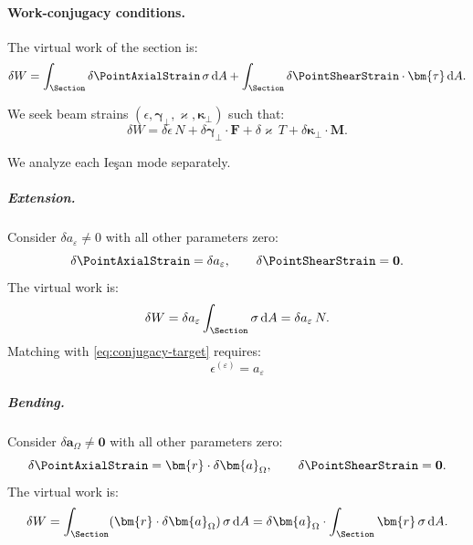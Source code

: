 \paragraph{Work-conjugacy conditions.}

The virtual work of the section is:
\begin{equation}
\delta W = \int_\Section \delta\PointAxialStrain\,\sigma \, \mathrm{d}A 
+ \int_\Section \delta\PointShearStrain \cdot \bm{\tau} \, \mathrm{d}A.
\label{eq:virtual-work}
\end{equation}

We seek beam strains $(\epsilon, \bm{\gamma}_\perp, \varkappa, \bm{\kappa}_\perp)$ 
such that:
\begin{equation}
\delta W = \delta\epsilon\,N + \delta\bm{\gamma}_\perp \cdot \bm{F} 
+ \delta\varkappa\,T + \delta\bm{\kappa}_\perp \cdot \bm{M}.
\label{eq:conjugacy-target}
\end{equation}

We analyze each Ieşan mode separately.

\subparagraph{Extension.}

Consider $\delta a_\varepsilon \neq 0$ with all other parameters zero:
\begin{equation*}
\delta\PointAxialStrain = \delta a_\varepsilon, \qquad \delta\PointShearStrain = \mathbf{0}.
\end{equation*}
The virtual work is:
\begin{equation*}
\delta W = \delta a_\varepsilon \int_\Section \sigma \, \mathrm{d}A = \delta a_\varepsilon\,N.
\end{equation*}
Matching with \eqref{eq:conjugacy-target} requires:
\begin{equation*}
\boxed{\epsilon^{(\varepsilon)} = a_\varepsilon}
\end{equation*}

\subparagraph{Bending.}

Consider $\delta\bm{a}_\Omega \neq \mathbf{0}$ with all other parameters zero:
\begin{equation*}
\delta\PointAxialStrain = \bm{r} \cdot \delta\bm{a}_\Omega, \qquad \delta\PointShearStrain = \mathbf{0}.
\end{equation*}
The virtual work is:
\begin{equation*}
\delta W = \int_\Section (\bm{r} \cdot \delta\bm{a}_\Omega)\,\sigma \, \mathrm{d}A 
= \delta\bm{a}_\Omega \cdot \int_\Section \bm{r}\,\sigma \, \mathrm{d}A.
\end{equation*}

